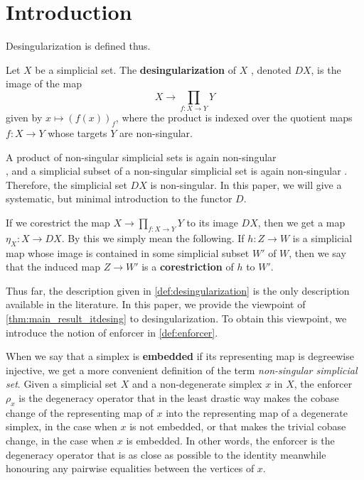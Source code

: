 \section{Introduction}
\label{sec:intro_itdesing}

Desingularization is defined thus.
\begin{definition}\label{def:desingularization}
Let $X$ be a simplicial set. The \textbf{desingularization} of $X$ \cite[Rem.~2.2.12]{WJR13}, denoted $DX$, is the image of the map
\[X\to \prod _{f:X\rightarrow Y}Y\]
given by $x\mapsto (f(x))_f$, where the product is indexed over the quotient maps $f:X\rightarrow Y$ whose targets $Y$ are non-singular.
\end{definition}
\noindent A product of non-singular simplicial sets is again non-singular\\ \cite[Rem.~2.2.12]{WJR13}, and a simplicial subset of a non-singular simplicial set is again non-singular \cite[Rem.~2.2.12]{WJR13}. Therefore, the simplicial set $DX$ is non-singular. In this paper, we will give a systematic, but minimal introduction to the functor $D$.

If we corestrict the map $X\to \prod _{f:X\rightarrow Y}Y$ to its image $DX$, then we get a map $\eta _X:X\to DX$. By this we simply mean the following. If $h:Z\to W$ is a simplicial map whose image is contained in some simplicial subset $W'$ of $W$, then we say that the induced map $Z\to W'$ is a \textbf{corestriction} of $h$ to $W'$.

Thus far, the description given in \cref{def:desingularization} is the only description available in the literature. In this paper, we provide the viewpoint of \cref{thm:main_result_itdesing} to desingularization. To obtain this viewpoint, we introduce the notion of enforcer in \cref{def:enforcer}.

When we say that a simplex is \textbf{embedded} if its representing map is degreewise injective, we get a more convenient definition of the term \emph{non-singular simplicial set}. Given a simplicial set $X$ and a non-degenerate simplex $x$ in $X$, the enforcer $\rho _x$ is the degeneracy operator that in the least drastic way makes the cobase change of the representing map of $x$ into the representing map of a degenerate simplex, in the case when $x$ is not embedded, or that makes the trivial cobase change, in the case when $x$ is embedded. In other words, the enforcer is the degeneracy operator that is as close as possible to the identity meanwhile honouring any pairwise equalities between the vertices of $x$.

